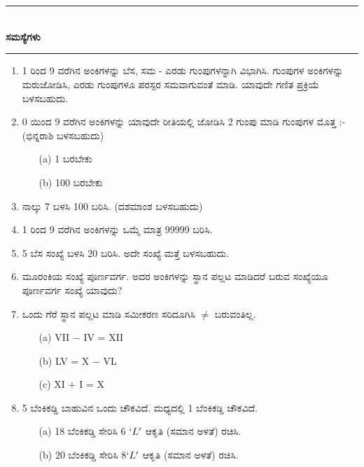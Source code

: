 \chapter[ಅಧ್ಯಾಯ 10]{}\label{chap10}


\begin{center}
\rule{5cm}{1pt}\\[5pt]
{\Large\bfseries ಸಮಸ್ಯೆಗಳು}\\[3pt]
\rule{5cm}{1pt}
\end{center}

\begin{enumerate}
\renewcommand{\labelenumi}{\bf\theenumi.}
\itemsep=5pt

\item 1 ರಿಂದ 9 ವರೆಗಿನ ಅಂಕಿಗಳನ್ನು ಬೆಸ, ಸಮ - ಎರಡು ಗುಂಪುಗಳನ್ನಾಗಿ ವಿಭಾಗಿಸಿ. ಗುಂಪುಗಳ ಅಂಕಿಗಳನ್ನು ಮರುಜೋಡಿಸಿ, ಎರಡು ಗುಂಪುಗಳೂ ಪರಸ್ಪರ ಸಮವಾಗುವಂತೆ ಮಾಡಿ. ಯಾವುದೇ ಗಣಿತ ಪ್ರಕ್ರಿಯೆ ಬಳಸಬಹುದು. 

\item 0 ಯಿಂದ 9 ವರೆಗಿನ ಅಂಕಿಗಳನ್ನು ಯಾವುದೇ ರೀತಿಯಲ್ಲಿ ಜೋಡಿಸಿ 2 ಗುಂಪು ಮಾಡಿ ಗುಂಪುಗಳ ಮೊತ್ತ :- (ಭಿನ್ನರಾಶಿ ಬಳಸಬಹುದು)
\begin{itemize}
\item[(a)] 1 ಬರಬೇಕು 
\item[(b)] 100 ಬರಬೇಕು 
\end{itemize}

\item ನಾಲ್ಕು 7 ಬಳಸಿ 100 ಬರಿಸಿ. (ದಶಮಾಂಶ ಬಳಸಬಹುದು)

\item 1 ರಿಂದ 9 ವರೆಗಿನ ಅಂಕಿಗಳನ್ನು ಒಮ್ಮೆ ಮಾತ್ರ 99999 ಬರಿಸಿ. 

\item 5 ಬೆಸ ಸಂಖ್ಯೆ ಬಳಸಿ 20 ಬರಿಸಿ. ಅದೇ ಸಂಖ್ಯೆ ಮತ್ತೆ ಬಳಸಬಹುದು. 

\item ಮೂರಂಕಿಯ ಸಂಖ್ಯೆ ಪೂರ್ಣವರ್ಗ. ಅದರ ಅಂಕಿಗಳನ್ನು ಸ್ಥಾನ ಪಲ್ಲಟ ಮಾಡಿದರೆ ಬರುವ ಸಂಖ್ಯೆಯೂ ಪೂರ್ಣವರ್ಗ ಸಂಖ್ಯೆ ಯಾವುದು? 

\item ಒಂದು ಗೆರೆ ಸ್ಥಾನ ಪಲ್ಲಟ ಮಾಡಿ ಸಮೀಕರಣ ಸರಿದೂಗಿಸಿ $\neq$ ಬರುವಂತಿಲ್ಲ. 
\begin{itemize}
\item[(a)] VII $-$ IV = XII
\item[(b)] LV = X $-$ VL
\item[(c)] XI $+$ I = X
\end{itemize}


\item 5 ಬೆಂಕಿಕಡ್ಡಿ ಬಾಹುವಿನ ಒಂದು ಚೌಕವಿದೆ. ಮಧ್ಯದಲ್ಲಿ 1 ಬೆಂಕಿಕಡ್ಡಿ  ಚೌಕವಿದೆ. 
\begin{itemize}
\item[(a)] 18 ಬೆಂಕಿಕಡ್ಡಿ ಸೇರಿಸಿ 6 $`L'$ ಆಕೃತಿ (ಸಮಾನ ಅಳತೆ) ರಚಿಸಿ. 
\item[(b)] 20 ಬೆಂಕಿಕಡ್ಡಿ ಸೇರಿಸಿ 8$`L'$ ಆಕೃತಿ (ಸಮಾನ ಅಳತೆ) ರಚಿಸಿ. 
\end{itemize}


\end{enumerate}
